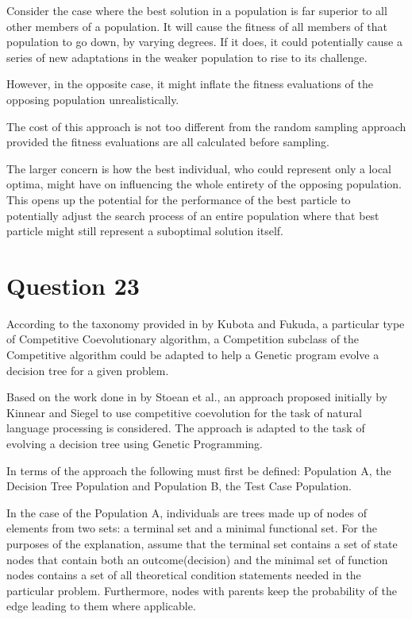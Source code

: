 \documentclass[12pt]{article}
\begin{document}
	Consider the case where the best solution in a population is far superior to all other members of a population. It will cause the fitness of all members of that population to go down, by varying degrees. If it does, it could potentially cause a series of new adaptations in the weaker population to rise to its challenge. 

	However, in the opposite case, it might inflate the fitness evaluations of the opposing population unrealistically.

	The cost of this approach is not too different from the random sampling approach provided the fitness evaluations are all calculated before sampling.

	The larger concern is how the best individual, who could represent only a local optima, might have on influencing the whole entirety of the opposing population. This opens up the potential for the performance of the best particle to potentially adjust the search process of an entire population where that best particle might still represent a suboptimal solution itself.
\section{Question 23}
According to the taxonomy provided in \cite{fukuda_kubota_1998} by Kubota and Fukuda, a particular type of Competitive Coevolutionary algorithm, a Competition subclass of the Competitive algorithm could be adapted to help a Genetic program evolve a decision tree for a given problem.	

Based on the work done in \cite{stoean_stoean_2014} by Stoean et al.,  an approach proposed initially by Kinnear and Siegel \cite{Kinnear1994CompetitivelyED} to use competitive coevolution for the task of natural language processing is considered. The approach is adapted to the task of evolving a decision tree using Genetic Programming.

In terms of the approach the following must first be defined: Population A, the Decision Tree Population and Population B, the Test Case Population.

In the case of the Population A, individuals are trees made up of nodes of elements from two sets: a terminal set and a minimal functional set. For the purposes of the explanation, assume that the terminal set contains a set of state nodes that contain both an outcome(decision) and the minimal set of function nodes contains a set of all theoretical condition statements needed in the particular problem. Furthermore, nodes with parents keep the probability of the edge leading to them where applicable.
\end{document}
